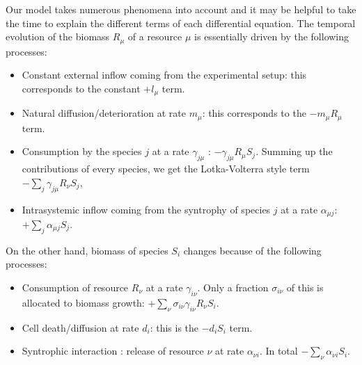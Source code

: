 \documentclass[12pt, titlepage]{report}
\begin{document}
Our model takes numerous phenomena into account and it may be helpful to take the time to explain the different terms of each differential equation. The temporal evolution of the biomass $R_\mu$ of a resource $\mu$ is essentially driven by the following processes:
\begin{itemize}
  \item Constant external inflow coming from the experimental setup: this corresponds to the constant $+l_\mu$ term.
  \item Natural diffusion/deterioration at rate $m_\mu$: this corresponds to the $-m_\mu R_\mu$ term.
  \item Consumption by the species $j$ at a rate $\gamma_{j\mu}$ : $-\gamma_{j\mu} R_\mu S_j$. Summing up the contributions of every species, we get the Lotka-Volterra style \cite{lotka_analytical_1920} term  $-\sum_j \gamma_{j\mu}R_\nu S_j$,
  \item Intrasystemic inflow coming from the syntrophy of species $j$ at a rate $\alpha_{\mu j}$: $+\sum_j \alpha_{\mu j} S_j$.
\end{itemize}
On the other hand, biomass of species $S_i$ changes because of the following processes:
\begin{itemize}
  \item Consumption of resource $R_\nu$ at a rate $\gamma_{i\nu}$. Only a fraction $\sigma_{i\nu}$ of this is allocated to biomass growth: $+\sum_\nu \sigma_{i\nu} \gamma_{i\nu}R_\nu S_i$.
  \item Cell death/diffusion at rate $d_i$: this is the $-d_i S_i$ term.
  \item Syntrophic interaction : release of resource $\nu$ at rate $\alpha_{\nu i}$. In total $-\sum_\nu \alpha_{\nu i} S_i$.
\end{itemize}
\end{document}
